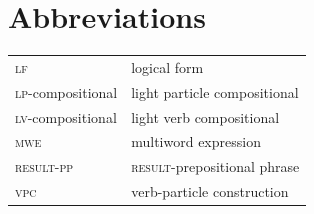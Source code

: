 \documentclass[output=paper,modfonts,nonflat]{langsci/langscibook}
\begin{document}
\section*{Abbreviations}

\begin{tabularx}{.96\textwidth}{ll}
\textsc{lf} & logical form  \\\textsc{lp}-compositional  & light particle compositional  \\
\textsc{lv}-compositional & light verb compositional   \\
\textsc{mwe} & multiword expression  \\
\textsc{result-pp} & \textsc{result}-prepositional phrase  \\
\textsc{vpc} & verb-particle construction \\
\end{tabularx}



{\sloppy
\printbibliography[heading=subbibliography,notkeyword=this]
}
\end{document}
